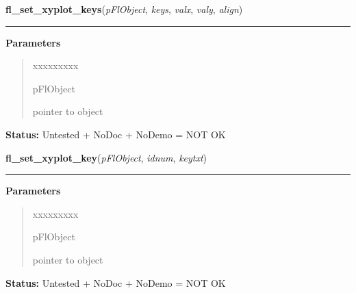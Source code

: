 \hspace{.8\funcindent}\begin{boxedminipage}{\funcwidth}

    \raggedright \textbf{fl\_set\_xyplot\_keys}(\textit{pFlObject}, \textit{keys}, \textit{valx}, \textit{valy}, \textit{align})

    \vspace{-1.5ex}

    \rule{\textwidth}{0.5\fboxrule}
\setlength{\parskip}{2ex}
\setlength{\parskip}{1ex}
      \textbf{Parameters}
      \vspace{-1ex}

      \begin{quote}
        \begin{Ventry}{xxxxxxxxx}

          \item[pFlObject]

          pointer to object

        \end{Ventry}

      \end{quote}

\textbf{Status:} Untested + NoDoc + NoDemo = NOT OK



    \end{boxedminipage}

    \label{xformslib:flxyplot:fl_set_xyplot_key}

    \vspace{0.5ex}

\hspace{.8\funcindent}\begin{boxedminipage}{\funcwidth}

    \raggedright \textbf{fl\_set\_xyplot\_key}(\textit{pFlObject}, \textit{idnum}, \textit{keytxt})

    \vspace{-1.5ex}

    \rule{\textwidth}{0.5\fboxrule}
\setlength{\parskip}{2ex}
\setlength{\parskip}{1ex}
      \textbf{Parameters}
      \vspace{-1ex}

      \begin{quote}
        \begin{Ventry}{xxxxxxxxx}

          \item[pFlObject]

          pointer to object

        \end{Ventry}

      \end{quote}

\textbf{Status:} Untested + NoDoc + NoDemo = NOT OK



    \end{boxedminipage}

